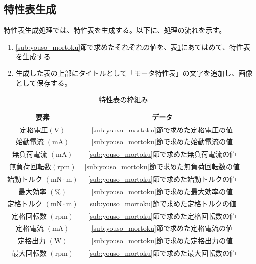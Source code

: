 \subsection{特性表生成}\label{sub:mortortoku}

特性表生成処理では、特性表を生成する。以下に、処理の流れを示す。
\begin{enumerate}
    \item \ref{sub:youso_mortoku}節で求めたそれぞれの値を、表\ref{tab:wakugumi}にあてはめて、特性表を生成する
    \item 生成した表の上部にタイトルとして「モータ特性表」の文字を追加し、画像として保存する。
\end{enumerate}

\begin{table}[t]
	\centering
	\caption{特性表の枠組み}
	\begin{tabular}{|c|c|} \hline
	  要素 & データ \\ \hline \hline
	  定格電圧$(\mathrm{V})$ & \ref{sub:youso_mortoku}節で求めた定格電圧の値 \\ \hline
      始動電流 $(\mathrm{mA})$&  \ref{sub:youso_mortoku}節で求めた始動電流の値 \\ \hline
      無負荷電流 $(\mathrm{mA})$&  \ref{sub:youso_mortoku}節で求めた無負荷電流の値\\ \hline
      無負荷回転数$(\mathrm{rpm})$& \ref{sub:youso_mortoku}節で求めた無負荷回転数の値  \\ \hline
	  始動トルク $(\mathrm{mN \cdot m})$& \ref{sub:youso_mortoku}節で求めた始動トルクの値  \\ \hline
      最大効率 $(\mathrm{\%})$& \ref{sub:youso_mortoku}節で求めた最大効率の値  \\ \hline
      定格トルク $(\mathrm{mN \cdot m})$& \ref{sub:youso_mortoku}節で求めた定格トルクの値 \\ \hline
	  定格回転数 $(\mathrm{rpm})$& \ref{sub:youso_mortoku}節で求めた定格回転数の値  \\ \hline
      定格電流 $(\mathrm{mA})$& \ref{sub:youso_mortoku}節で求めた定格電流の値  \\ \hline
      定格出力 $(\mathrm{W})$& \ref{sub:youso_mortoku}節で求めた定格出力の値 \\ \hline
	  最大回転数 $(\mathrm{rpm})$&  \ref{sub:youso_mortoku}節で求めた最大回転数の値 \\ \hline
	\end{tabular}
	\label{tab:wakugumi}
  \end{table}

